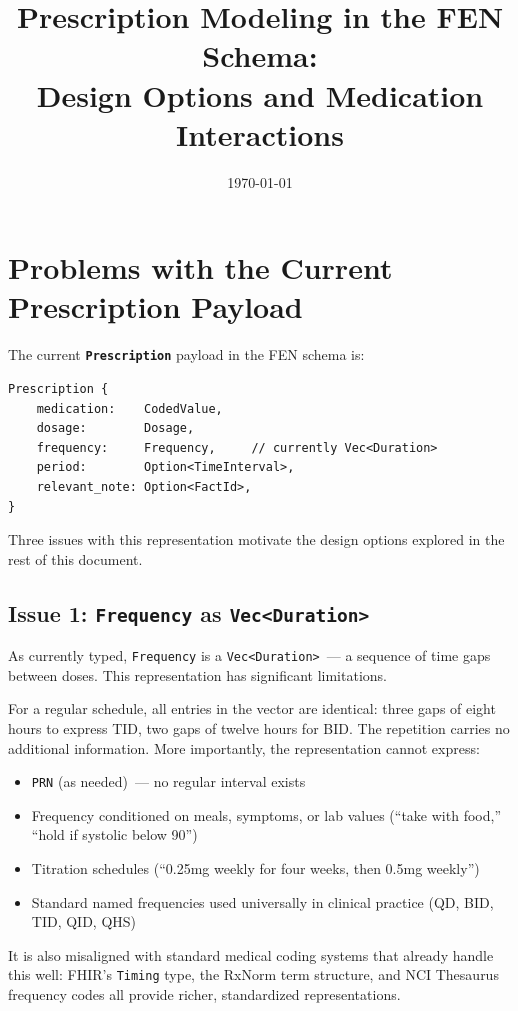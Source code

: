 \documentclass[11pt]{article}
\title{Prescription Modeling in the FEN Schema:\\
Design Options and Medication Interactions}
\date{\today}
\newcommand{\entity}[1]{\texttt{\textbf{#1}}}
\newcommand{\field}[1]{\texttt{#1}}
\begin{document}
\maketitle

\section{Problems with the Current Prescription Payload}
\label{sec:current-problems}

The current \entity{Prescription} payload in the FEN schema is:

\begin{lstlisting}
Prescription {
    medication:    CodedValue,
    dosage:        Dosage,
    frequency:     Frequency,     // currently Vec<Duration>
    period:        Option<TimeInterval>,
    relevant_note: Option<FactId>,
}
\end{lstlisting}

Three issues with this representation motivate the design options
explored in the rest of this document.

\subsection{Issue 1: \texttt{Frequency} as \texttt{Vec<Duration>}}
\label{sec:freq}

As currently typed, \field{Frequency} is a \texttt{Vec<Duration>}~---
a sequence of time gaps between doses. This representation has
significant limitations.

For a regular schedule, all entries in the vector are identical:
three gaps of eight hours to express TID, two gaps of twelve hours for
BID. The repetition carries no additional information. More
importantly, the representation cannot express:

\begin{itemize}[noitemsep]
  \item \field{PRN} (as needed)~--- no regular interval exists
  \item Frequency conditioned on meals, symptoms, or lab values
    (``take with food,'' ``hold if systolic below 90'')
  \item Titration schedules (``0.25mg weekly for four weeks,
    then 0.5mg weekly'')
  \item Standard named frequencies used universally in clinical
    practice (QD, BID, TID, QID, QHS)
\end{itemize}

It is also misaligned with standard medical coding systems that
already handle this well: FHIR's \texttt{Timing} type, the RxNorm
term structure, and NCI Thesaurus frequency codes all provide richer,
standardized representations.
\end{document}
